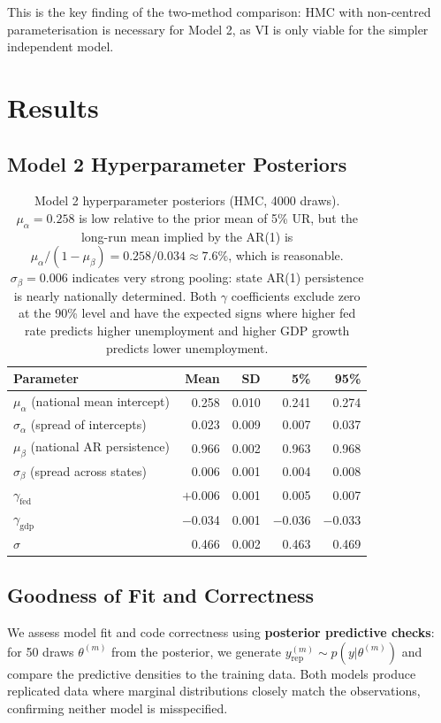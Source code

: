 \documentclass[10pt]{article}
\begin{document}
This is the key finding of the two-method comparison: HMC with non-centred
parameterisation is necessary for Model 2, as VI is only viable for the
simpler independent model.
\section{Results}

\subsection{Model 2 Hyperparameter Posteriors}
\begin{table}[H]\centering\small
\begin{tabular}{lrrrr}
\toprule
Parameter & Mean & SD & 5\% & 95\% \\\midrule
$\mu_\alpha$ (national mean intercept)& 0.258 & 0.010 & 0.241 & 0.274 \\
$\sigma_\alpha$ (spread of intercepts) & 0.023 & 0.009 & 0.007 & 0.037 \\
$\mu_\beta$ (national AR persistence) & 0.966 & 0.002 & 0.963 & 0.968 \\
$\sigma_\beta$ (spread across states)  & 0.006 & 0.001 & 0.004 & 0.008 \\
$\gamma_{\mathrm{fed}}$ & $+$0.006 & 0.001 & 0.005 & 0.007 \\
$\gamma_{\mathrm{gdp}}$ & $-$0.034 & 0.001 & $-$0.036 & $-$0.033 \\
$\sigma$ & 0.466 & 0.002 & 0.463 & 0.469 \\
\bottomrule
\end{tabular}
\caption{Model 2 hyperparameter posteriors (HMC, 4000 draws). \\ 
$\mu_\alpha = 0.258$ is low relative to the prior mean of 5\% UR, but
the long-run mean implied by the AR(1) is $\mu_\alpha / (1 - \mu_\beta)
= 0.258 / 0.034 \approx 7.6\%$, which is reasonable.
$\sigma_\beta = 0.006$ indicates very strong pooling: state AR(1)
persistence is nearly nationally determined.
Both $\gamma$ coefficients exclude zero at the 90\% level and have
the expected signs where higher fed rate predicts higher unemployment and
higher GDP growth predicts lower unemployment.}
\label{tab:hyper}
\end{table}

\subsection{Goodness of Fit and Correctness}
We assess model fit and code correctness using \textbf{posterior predictive checks}: 
for 50 draws $\theta^{(m)}$ from the
posterior, we generate $y_\mathrm{rep}^{(m)}\sim p(y|\theta^{(m)})$
and compare the predictive densities to the training data.
Both models produce replicated data where marginal distributions
closely match the observations, confirming neither model is
misspecified.
\end{document}
